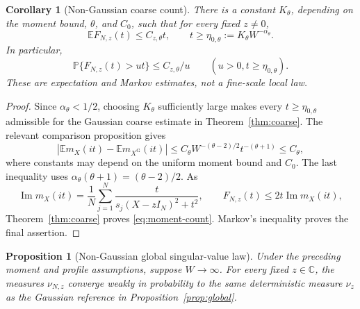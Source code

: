 \documentclass[11pt,reqno]{amsart}
\numberwithin{equation}{section}
\theoremstyle{plain}
\newtheorem{proposition}[theorem]{Proposition}
\newtheorem{corollary}[theorem]{Corollary}
\theoremstyle{definition}
\theoremstyle{remark}
\begin{document}
\begin{corollary}[Non-Gaussian coarse count]\label{cor:moment-count}
There is a constant $K_\theta$, depending on the moment bound, $\theta$,
and $C_0$, such that for every fixed $z\ne0$,
\begin{equation}\label{eq:moment-count}
 \mathbb E F_{N,z}(t)\le C_{z,\theta}t,
 \qquad t\ge\eta_{0,\theta}:=K_\theta W^{-\alpha_\theta}.
\end{equation}
In particular,
\[
 \mathbb P\{F_{N,z}(t)>u t\}\le C_{z,\theta}/u
 \qquad(u>0, t\ge\eta_{0,\theta}).
\]
These are expectation and Markov estimates, not a fine-scale local law.
\end{corollary}

\begin{proof}
Since $\alpha_\theta<1/2$, choosing $K_\theta$ sufficiently large makes
every $t\ge\eta_{0,\theta}$ admissible for the Gaussian coarse estimate
in Theorem~\ref{thm:coarse}.  The relevant comparison proposition gives
\[
 \left|\mathbb Em_X(it)-\mathbb Em_{X^{\mathrm G}}(it)\right|
 \le C_\theta W^{-(\theta-2)/2}t^{-(\theta+1)}\le C_\theta,
\]
where constants may depend on the uniform moment bound and $C_0$.
The last inequality uses
$\alpha_\theta(\theta+1)=(\theta-2)/2$.  As
\[
 \operatorname{Im}m_X(it)=\frac1N\sum_{j=1}^N
          \frac{t}{s_j(X-zI_N)^2+t^2},
 \qquad F_{N,z}(t)\le2t\operatorname{Im}m_X(it),
\]
Theorem~\ref{thm:coarse} proves \eqref{eq:moment-count}.  Markov's
inequality proves the final assertion.
\end{proof}

\begin{proposition}[Non-Gaussian global singular-value law]
\label{prop:moment-global}
Under the preceding moment and profile assumptions, suppose $W\to\infty$.
For every fixed $z\in\mathbb C$, the measures $\nu_{N,z}$ converge weakly
in probability to the same deterministic measure $\nu_z$ as the Gaussian
reference in Proposition~\ref{prop:global}.
\end{proposition}
\end{document}
